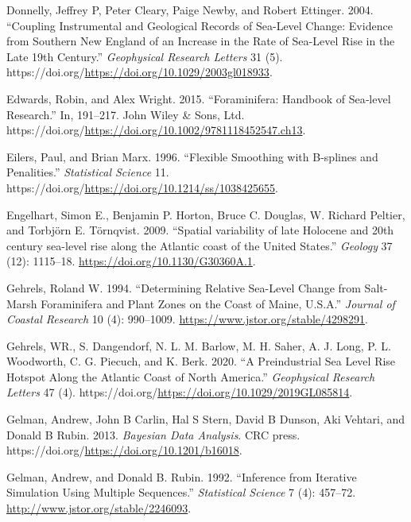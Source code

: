 \begin{CSLReferences}{1}{0}
\leavevmode{}%
Donnelly, Jeffrey P, Peter Cleary, Paige Newby, and Robert Ettinger. 2004. {``Coupling Instrumental and Geological Records of Sea-Level Change: Evidence from Southern {N}ew {E}ngland of an Increase in the Rate of Sea-Level Rise in the Late 19th Century.''} \emph{Geophysical Research Letters} 31 (5). https://doi.org/\url{https://doi.org/10.1029/2003gl018933}.

\leavevmode{}%
Edwards, Robin, and Alex Wright. 2015. {``Foraminifera: Handbook of Sea‐level Research.''} In, 191--217. John Wiley \& Sons, Ltd. https://doi.org/\url{https://doi.org/10.1002/9781118452547.ch13}.

\leavevmode{}%
Eilers, Paul, and Brian Marx. 1996. {``{Flexible Smoothing with B-splines and Penalities}.''} \emph{Statistical Science} 11. https://doi.org/\url{https://doi.org/10.1214/ss/1038425655}.

\leavevmode{}%
Engelhart, Simon E., Benjamin P. Horton, Bruce C. Douglas, W. Richard Peltier, and Torbjörn E. Törnqvist. 2009. {``{Spatial variability of late Holocene and 20th century sea-level rise along the Atlantic coast of the United States}.''} \emph{Geology} 37 (12): 1115--18. \url{https://doi.org/10.1130/G30360A.1}.

\leavevmode{}%
Gehrels, Roland W. 1994. {``{Determining Relative Sea-Level Change from Salt-Marsh Foraminifera and Plant Zones on the Coast of Maine, U.S.A.}''} \emph{Journal of Coastal Research} 10 (4): 990--1009. \url{https://www.jstor.org/stable/4298291}.

\leavevmode{}%
Gehrels, WR., S. Dangendorf, N. L. M. Barlow, M. H. Saher, A. J. Long, P. L. Woodworth, C. G. Piecuch, and K. Berk. 2020. {``{A Preindustrial Sea Level Rise Hotspot Along the Atlantic Coast of North America}.''} \emph{Geophysical Research Letters} 47 (4). https://doi.org/\url{https://doi.org/10.1029/2019GL085814}.

\leavevmode{}%
Gelman, Andrew, John B Carlin, Hal S Stern, David B Dunson, Aki Vehtari, and Donald B Rubin. 2013. \emph{Bayesian Data Analysis}. CRC press. https://doi.org/\url{https://doi.org/10.1201/b16018}.

\leavevmode{}%
Gelman, Andrew, and Donald B. Rubin. 1992. {``Inference from Iterative Simulation Using Multiple Sequences.''} \emph{Statistical Science} 7 (4): 457--72. \url{http://www.jstor.org/stable/2246093}.


\end{CSLReferences}
